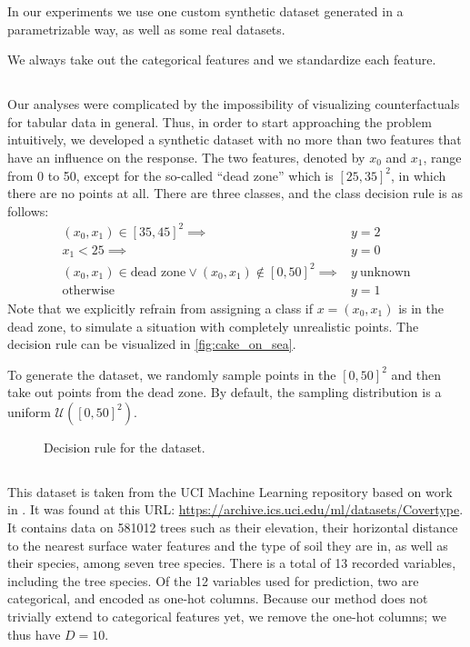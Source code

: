 \documentclass[../main.tex]{subfiles}
\begin{document}
In our experiments we use one custom synthetic dataset generated in a parametrizable way, as well as some real datasets.

We always take out the categorical features and we standardize each feature.

\subsection{\CakeOnSea}

Our analyses were complicated by the impossibility of visualizing counterfactuals for tabular data in general.
Thus, in order to start approaching the problem intuitively, we developed a synthetic dataset with no more than two features that have an influence on the response.
The two features, denoted by $x_0$ and $x_1$, range from 0 to 50, except for the so-called ``dead zone'' which is $[25, 35]^2$, in which there are no points at all.
There are three classes, and the class decision rule is as follows:
\begin{align*}
    (x_0, x_1) \in [35, 45]^2 \implies & y = 2 \\
    x_1 < 25                  \implies & y = 0 \\
    (x_0, x_1) \in \text{dead zone} \lor (x_0, x_1) \notin [0, 50]^2  \implies & y\ \text{unknown} \\
    \text{otherwise} \qquad            & y = 1
\end{align*}
Note that we explicitly refrain from assigning a class if $x = (x_0, x_1)$ is in the dead zone, to simulate a situation with completely unrealistic points.
The decision rule can be visualized in \autoref{fig:cake_on_sea}.

To generate the dataset, we randomly sample points in the $[0, 50]^2$ and then take out points from the dead zone. By default, the sampling distribution is a uniform $\mathcal{U}([0, 50]^2)$.

\begin{figure}[h]
    \centering
    
\caption{Decision rule for the \CakeOnSea dataset.}
    \label{fig:cake_on_sea}
\end{figure}

\subsection{\ForestCover}

This dataset is taken from the UCI Machine Learning repository \cite{duaUCI2019} based on work in \cite{blackardComparative1999}. It was found at this URL: \url{https://archive.ics.uci.edu/ml/datasets/Covertype}.
It contains data on 581012 trees such as their elevation, their horizontal distance to the nearest surface water features and the type of soil they are in, as well as their species, among seven tree species. There is a total of 13 recorded variables, including the tree species. Of the 12 variables used for prediction, two are categorical, and encoded as one-hot columns.
Because our method does not trivially extend to categorical features yet, we remove the one-hot columns; we thus have $D = 10$.
\end{document}
